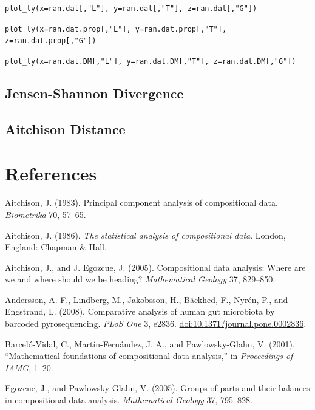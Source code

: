 \documentclass[twocolumn]{article}
\begin{document}
\texttt{plot\_ly(x=ran.dat[,"L"], y=ran.dat[,"T"], z=ran.dat[,"G"])}

\texttt{plot\_ly(x=ran.dat.prop[,"L"], y=ran.dat.prop[,"T"], z=ran.dat.prop[,"G"])}

\texttt{plot\_ly(x=ran.dat.DM[,"L"], y=ran.dat.DM[,"T"], z=ran.dat.DM[,"G"])}

\subsection{Jensen-Shannon Divergence}\subsection{Aitchison Distance}

\clearpage

\section*{References}\label{references}

Aitchison, J. (1983). Principal component analysis of compositional
data. \emph{Biometrika} 70, 57--65.

Aitchison, J. (1986). \emph{The statistical analysis of compositional
data}. London, England: Chapman \& Hall.

Aitchison, J., and J. Egozcue, J. (2005). Compositional data analysis:
Where are we and where should we be heading? \emph{Mathematical Geology}
37, 829--850.

Andersson, A. F., Lindberg, M., Jakobsson, H., Bäckhed, F., Nyrén, P.,
and Engstrand, L. (2008). Comparative analysis of human gut microbiota
by barcoded pyrosequencing. \emph{PLoS One} 3, e2836.
\href{http://doi.org/10.1371/journal.pone.0002836}{doi:10.1371/journal.pone.0002836}.

Barceló-Vidal, C., Martín-Fernández, J. A., and Pawlowsky-Glahn, V.
(2001). ``Mathematical foundations of compositional data analysis,'' in
\emph{Proceedings of IAMG}, 1--20.

Egozcue, J., and Pawlowsky-Glahn, V. (2005). Groups of parts and their
balances in compositional data analysis. \emph{Mathematical Geology} 37,
795--828.
\end{document}
